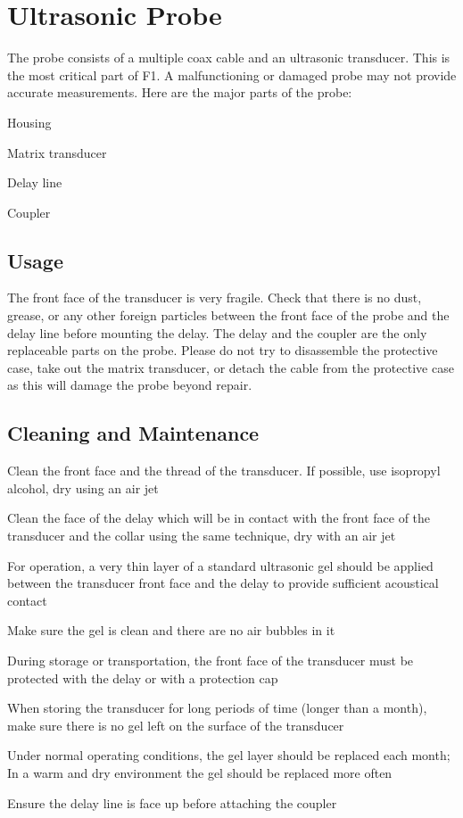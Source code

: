 \chapter[ultrasonic-probe]{Ultrasonic Probe}

The probe consists of a multiple coax cable and an ultrasonic transducer. This
is the most critical part of F1. A malfunctioning or damaged probe may not
provide accurate measurements. Here are the major parts of the probe:


\startnarrow[middle=8em]
\startcolumns[n=2]
\startitemize[n,packed][stopper=.]
\item
Housing
\item
Matrix transducer
\item
Delay line
\item
Coupler
\stopitemize
\stopcolumns
\stopnarrow

\section[usage]{Usage}

The front face of the transducer is very fragile. Check that there is no dust,
grease, or any other foreign particles between the front face of the probe and
the delay line before mounting the delay. The delay and the coupler are the only
replaceable parts on the probe. Please do not try to disassemble the protective
case, take out the matrix transducer, or detach the cable from the protective
case as this will damage the probe beyond repair.

\section[cleaning-and-maintenance]{Cleaning and Maintenance}

\startitemize
\item
Clean the front face and the thread of the transducer. If possible, use
isopropyl alcohol, dry using an air jet
\item
Clean the face of the delay which will be in contact with the front face of
the transducer and the collar using the same technique, dry with an air jet
\item
For operation, a very thin layer of a standard ultrasonic gel should be
applied between the transducer front face and the delay to provide sufficient
acoustical contact
\item
Make sure the gel is clean and there are no air bubbles in it
\item
During storage or transportation, the front face of the transducer must be
protected with the delay or with a protection cap
\item
When storing the transducer for long periods of time (longer than a month),
make sure there is no gel left on the surface of the transducer
\item
Under normal operating conditions, the gel layer should be replaced each
month; In a warm and dry environment the gel should be replaced more often
\stopitemize

Ensure the delay line is face up before attaching the coupler
\stopWARNING